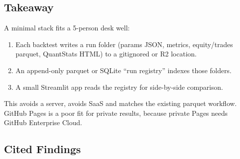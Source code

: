 \documentclass{article}
\begin{document}
\subsection{Takeaway}

A minimal stack fits a 5-person desk well:

\begin{enumerate}

\item Each backtest writes a run folder (params JSON, metrics, equity/\allowbreak{}trades parquet, QuantStats HTML) to a gitignored or R2 location.

\item An append-only parquet or SQLite ``run registry'' indexes those folders.

\item A small Streamlit app reads the registry for side-by-side comparison.

\end{enumerate}

This avoids a server, avoids SaaS and matches the existing parquet workflow. GitHub Pages is a poor fit for private results, because private Pages needs GitHub Enterprise Cloud.

\subsection{Cited Findings}
\end{document}
